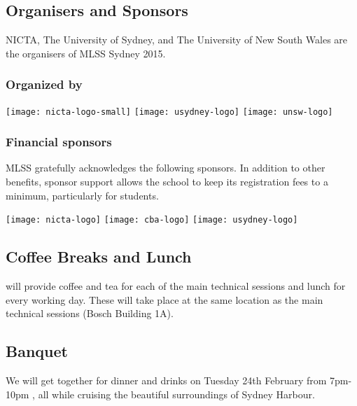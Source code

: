 \subsection*{Organisers and Sponsors}
NICTA, The University of Sydney, and The University of New South Wales are the 
organisers of MLSS Sydney 2015.
%
\subsubsection*{Organized by}
\begin{center}
\texttt{[image: nicta-logo-small]}
\texttt{[image: usydney-logo]}
\texttt{[image: unsw-logo]}
\end{center}
%
\subsubsection*{Financial sponsors}
MLSS gratefully acknowledges the following sponsors.  In
addition to other benefits, sponsor support allows the school to
keep its registration  fees to a minimum, particularly for
students.
%
 \vspace{-0.2in}
\begin{center}
  \begin{figure*}[h!]
\centering
     \texttt{[image: nicta-logo]}
     \texttt{[image: cba-logo]}     
 \texttt{[image: usydney-logo]}
    \end{figure*}
\end{center}
%
{}
\subsection*{Coffee Breaks and Lunch}
\mlss will provide coffee and tea for each of the main technical sessions 
 and lunch for every working day. These will take place at the same location as 
 the main technical sessions (Bosch Building 1A).
%
%
%
{}
\subsection*{Banquet}  
%
We will get together for dinner and drinks on Tuesday 24th February from 7pm-10pm , all while cruising  the beautiful 
surroundings of Sydney Harbour.

